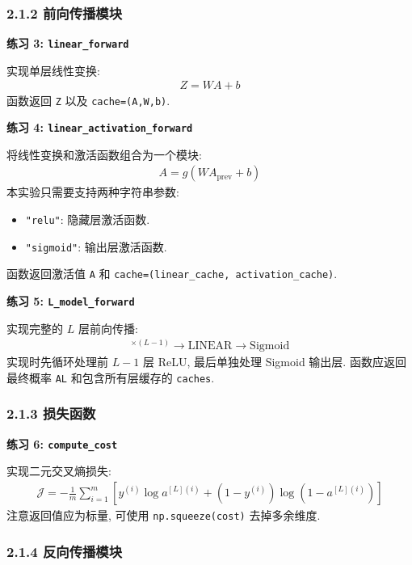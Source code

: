 \documentclass{../../nndlcourse}
\begin{document}
\subsubsection*{2.1.2 前向传播模块}

\textbf{练习 3: \texttt{linear\_forward}}

实现单层线性变换:
\begin{align}
    Z = WA + b
\end{align}
函数返回 \texttt{Z} 以及 \texttt{cache=(A,W,b)}.

\textbf{练习 4: \texttt{linear\_activation\_forward}}

将线性变换和激活函数组合为一个模块:
\begin{align}
    A = g(WA_{\mathrm{prev}}+b)
\end{align}
本实验只需要支持两种字符串参数:
\begin{itemize}
    \item \texttt{"relu"}: 隐藏层激活函数.
    \item \texttt{"sigmoid"}: 输出层激活函数.
\end{itemize}
函数返回激活值 \texttt{A} 和 \texttt{cache=(linear\_cache, activation\_cache)}.

\textbf{练习 5: \texttt{L\_model\_forward}}

实现完整的 $L$ 层前向传播:
\begin{align}
    [\mathrm{LINEAR}\to\mathrm{ReLU}]^{\times(L-1)}
    \to \mathrm{LINEAR}\to\mathrm{Sigmoid}
\end{align}
实现时先循环处理前 $L-1$ 层 ReLU, 最后单独处理 Sigmoid 输出层. 函数应返回最终概率 \texttt{AL} 和包含所有层缓存的 \texttt{caches}.

\subsubsection*{2.1.3 损失函数}

\textbf{练习 6: \texttt{compute\_cost}}

实现二元交叉熵损失:
\begin{align}
    \mathcal{J} =
    -\frac{1}{m}\sum_{i=1}^{m}
    \left[
        y^{(i)}\log a^{[L](i)}
        + (1-y^{(i)})\log(1-a^{[L](i)})
    \right]
\end{align}
注意返回值应为标量, 可使用 \texttt{np.squeeze(cost)} 去掉多余维度.

\subsubsection*{2.1.4 反向传播模块}
\end{document}
